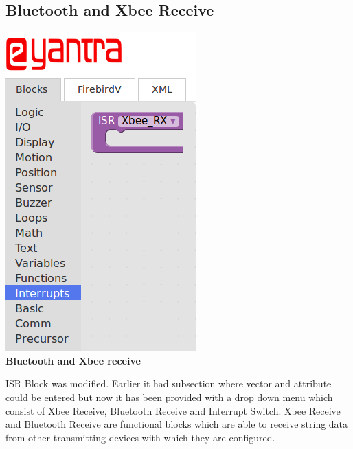 \documentclass[a4paper,12pt,oneside]{book}
\begin{document}
\subsection{Bluetooth and Xbee Receive}
    \begin{center}
    \includegraphics[scale =0.6]{xbrec}\\[.3in]
    \textbf{Bluetooth and Xbee receive}\\[1.3in]
    \end{center}
    ISR Block was modified. Earlier it had subsection where vector and attribute could be entered but now it has been provided with a drop down menu which consist of Xbee Receive, Bluetooth Receive and Interrupt Switch. Xbee Receive and Bluetooth Receive are functional blocks which are able to receive string data from other transmitting devices with which they are configured.   
\end{document}
